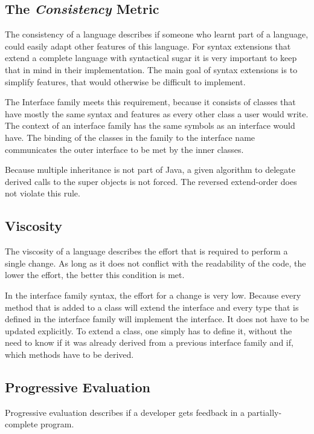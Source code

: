 \documentclass{report}
\begin{document}
\subsection{The \emph{Consistency} Metric}

The consistency of a language describes if someone who learnt part of a language, could easily adapt other features of this language. For syntax extensions that extend a complete language with syntactical sugar it is very important to keep that in mind in their implementation. The main goal of syntax extensions is to simplify features, that would otherwise be difficult to implement.

The Interface family meets this requirement, because it consists of classes that have mostly the same syntax and features as every other class a user would write. The context of an interface family has the same symbols as an interface would have. The binding of the classes in the family to the interface name communicates the outer interface to be met by the inner classes.

Because multiple inheritance is not part of Java, a given algorithm to delegate derived calls to the super objects is not forced. The reversed extend-order does not violate this rule.

\subsection{Viscosity}

The viscosity of a language describes the effort that is required to perform a single change. As long as it does not conflict with the readability of the code, the lower the effort, the better this condition is met.

In the interface family syntax, the effort for a change is very low. Because every method that is added to a class will extend the interface and every type that is defined in the interface family will implement the interface. It does not have to be updated explicitly. To extend a class, one simply has to define it, without the need to know if it was already derived from a previous interface family and if, which methods have to be derived.

\subsection{Progressive Evaluation}

Progressive evaluation describes if a developer gets feedback in a partially-complete program.
\end{document}
